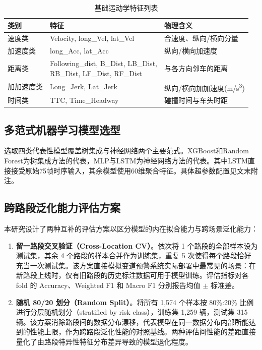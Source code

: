 \documentclass[preprint,review,12pt,a4paper]{elsarticle}
\begin{document}
\begin{table}[H]
\centering
\caption{基础运动学特征列表}
\label{tab:features}
\small
\begin{tabular}{llp{6cm}}
\toprule
类别 & 特征 & 物理含义 \\
\midrule
速度类 & Velocity, long\_Vel, lat\_Vel & 合速度、纵向/横向分量 \\
加速度类 & long\_Acc, lat\_Acc & 纵向/横向加速度 \\
距离类 & \makecell[l]{Following\_dist, B\_Dist, LB\_Dist, \\ RB\_Dist, LF\_Dist, RF\_Dist} & 与各方向邻车的距离 \\
加加速度类 & Long\_Jerk, Lat\_Jerk & 纵向/横向加加速度(m/s\textsuperscript{3}) \\
时间类 & TTC, Time\_Headway & 碰撞时间与车头时距 \\
\bottomrule
\end{tabular}
\end{table}

\subsection{多范式机器学习模型选型}

选取四类代表性模型覆盖树集成与神经网络两个主要范式。XGBoost\cite{C19}和Random Forest\cite{C20}为树集成方法的代表，MLP与LSTM\cite{C25}为神经网络方法的代表。其中LSTM直接接受原始75帧时序输入，其余模型使用60维聚合特征。具体超参数配置见文末附注。

\subsection{跨路段泛化能力评估方案}

本研究设计了两种互补的评估方案以区分模型的内在拟合能力与跨场景泛化能力：

\begin{enumerate}
  \item \textbf{留一路段交叉验证（Cross-Location CV）}。依次将 1 个路段的全部样本设为测试集，其余 4 个路段的样本合并作为训练集，重复 5 次使得每个路段恰好充当一次测试集。该方案直接模拟变道预警系统实际部署中最常见的场景：在新路段上线时，仅有旧路段的历史标注数据可用于模型训练。评估指标对各 fold 的 Accuracy、Weighted F1 和 Macro F1 分别报告均值 $\pm$ 标准差。

  \item \textbf{随机 80/20 划分（Random Split）}。将所有 1,574 个样本按 80\%:20\% 比例进行分层随机划分（stratified by risk class），训练集 1,259 辆，测试集 315 辆。该方案消除路段间的数据分布漂移，代表模型在同一数据分布内部所能达到的性能上限，作为跨路段泛化性能的对照基线。两种评估间性能的差距直接量化了由路段特异性特征分布差异导致的模型退化程度。
\end{enumerate}
\end{document}
